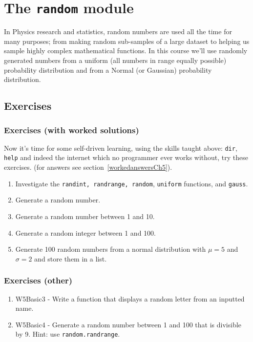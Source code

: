 \section{The {\tt random} module}
\label{randommodule}

In Physics research and statistics, random numbers are used all the time for many purposes; from making random sub-samples of a large dataset to helping us sample highly complex mathematical functions. In this course we'll use randomly generated numbers from a uniform (all numbers in range equally possible) probability distribution and from a Normal (or Gaussian) probability distribution.

\subsection{Exercises}

\subsubsection{Exercises (with worked solutions)}
\label{W5EWWS2}
\noindent Now it's time for some self-driven learning, using the skills taught above: \texttt{dir}, \texttt{help} and indeed the internet which no programmer ever works without, try these exercises. (for answers see section~\ref{workedanswersCh5}).
\begin{enumerate}
\item Investigate the {\tt randint, randrange, random}, {\tt uniform} functions, and {\tt gauss}.
\item Generate a random number.
\item Generate a random number between 1 and 10.
\item Generate a random integer between 1 and 100.
\item Generate 100 random numbers from a normal distribution with $\mu=5$ and $\sigma=2$ and store them in a list.
\end{enumerate}

\subsubsection{Exercises (other)}

\begin{enumerate}
    \item W5Basic3 - Write a function that displays a random letter from an inputted name.
    \item W5Basic4 - Generate a random number between 1 and 100 that is divisible by 9. Hint: use {\tt random.randrange}.
\end{enumerate}

